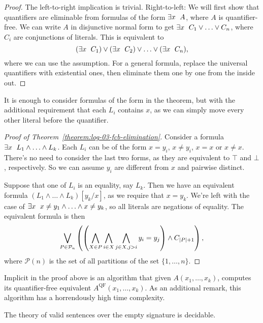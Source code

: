 \begin{proof}
  The left-to-right implication is trivial.
  Right-to-left:
  We will first show that quantifiers are eliminable from formulas of the form
  $\exists x \;\  A$, where $A$ is quantifier-free.
  We can write $A$ in disjunctive normal form to get $\exists x \;\  C_1 \lor
  \ldots \lor C_n$, where $C_i$ are conjunctions of literals.
  This is equivalent to
  \[
	(\exists x \;\  C_1) \lor (\exists x \;\  C_2) \lor \ldots \lor (\exists
	x \;\  C_n),
  \]
  where we can use the assumption.
  For a general formula, replace the universal quantifiers with existential
  ones, then eliminate them one by one from the inside out.
\end{proof}

\begin{remark}
  It is enough to consider formulas of the form in the theorem, but with the
  additional requirement that each $L_i$ contains $x$, as we can simply move
  every other literal before the quantifier.
\end{remark}

\begin{proof}[Proof of Theorem~\ref{theorem:log-03-fcb-elimination}]
  Consider a formula $\exists x \;\  L_1 \land \ldots \land L_k$.
  Each $L_i$ can be of the form $x = y_i$, $x \ne y_i$, $x = x$ or $x \ne x$.
  There's no need to consider the last two forms, as they are equivalent to
  $\top$ and $\bot$, respectively.
  So we can assume $y_i$ are different from $x$ and pairwise distinct.

  Suppose that one of $L_i$ is an equality, say $L_k$.
  Then we have an equivalent formula $(L_1 \land \ldots \land L_k)[y_k / x]$, as
  we require that $x = y_k$.
  We're left with the case of $\exists x \;\  x \ne y_1 \land \ldots \land x
  \ne y_k$, so all literals are negations of equality.
  The equivalent formula is then
  \[
	\bigvee_{P \in \mathcal{P}_n} \left(
	  \left(
		\bigwedge_{X \in P}
		\bigwedge_{i \in X} \bigwedge_{j \in X, j > i} y_i = y_j
	  \right)
	  \land C_{\left| P \right|+1}
	\right),
  \]
  where $\mathcal{P}(n)$ is the set of all partitions of the set $\{1, \ldots,
  n\}$.
\end{proof}

Implicit in the proof above is an algorithm that given $A(x_1, \ldots, x_k)$,
computes its quantifier-free equivalent $A^{\text{QF}}(x_1, \ldots, x_k)$.
As an additional remark, this algorithm has a horrendously high time complexity.

\begin{theorem}
  The theory of valid sentences over the empty signature is decidable.
\end{theorem}

